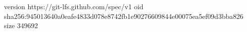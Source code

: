version https://git-lfs.github.com/spec/v1
oid sha256:945013640a0eafe4833d078e8742fb1e90276609844e00075ea5ef09d3bba826
size 349692
